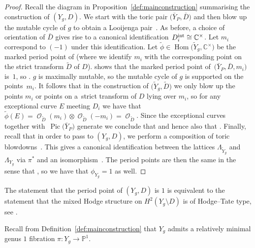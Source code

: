 \documentclass[pdftex]{sigma}
\numberwithin{equation}{section}
\DeclareMathOperator{\Hom}{{Hom}}
\DeclareMathOperator{\Pic}{{Pic}}
\DeclareMathOperator{\cO}{\mathcal{O}}
\newcommand{\CC}{\mathbb{C}}
\newcommand{\PP}{\mathbb{P}}
\begin{document}
	\begin{proof}
		Recall the diagram in Proposition~\ref{def:mainconstruction} summarising the construction of $(Y_g, D)$. We start with the toric pair $\bigl(\bar{Y}_P, \bar{D}\bigr)$ and then blow up the mutable cycle of $g$ to obtain a Looijenga pair~.
		As before, a choice of orientation of $\bar{D}$ gives rise to a canonical identification~${D_i^{\rm int} \cong \CC^\times}$. Let $m_i$ correspond to $(-1)$ under this identification. Let $\tilde{\phi} \in \Hom\bigl(\tilde{Y}_g, \CC^\times\bigr)$ be the marked period point of  (where we identify $m_i$ with the corresponding point on the strict transform $\tilde{D}$ of $D$).
		\cite[Lemma 2.8]{GrossHackingKeelLooijengapairs} shows that the marked period point of~${\bigl(\bar{Y}_P, \bar{D}, m_i\bigr)}$ is~$1$, so .
		$g$ is maximally mutable, so the mutable cycle of $g$ is supported on the points~$m_i$. It follows that in the construction of $\bigl(\tilde{Y}_g, \tilde{D}\bigr)$ we only blow up the points $m_i$ or points on a~strict transform of $D$ lying over $m_i$, so for any exceptional curve $E$ meeting $D_i$ we have that $\tilde{\phi}(E)=\cO_{\tilde{D}}(m_i) \otimes \cO_{\tilde{D}}(-m_i)=\cO_{\tilde{D}}$. Since the exceptional curves together with~$\Pic\bigl(\bar{Y}_P\bigr)$ generate \smash{$\Pic\bigl(\tilde{Y}_g\bigr)$} we conclude that  and hence also that .
		Finally, recall that in order to pass to $(Y_g, D)$, we perform a composition of toric blowdowns~. This gives a canonical identification between the lattices $\Lambda_{\tilde{Y}_g}$ and $\Lambda_{Y_g}$ via $\pi^*$ and an isomorphism~\smash{$\pi^* \colon \Pic^0(D) \rightarrow \Pic^0\bigl(\tilde{D}\bigr)$}. The period points are then the same in the sense that , so we have that $\phi_{Y_g}=1$ as well.
	\end{proof}
	
	\begin{Remark}
		The statement that the period point of $(Y_g, {D})$ is $1$ is equivalent to the statement that the mixed Hodge structure on $H^2(Y_g \setminus D)$ is of Hodge--Tate type, see \cite[Proposition~3.12]{Friedman}.
	\end{Remark}

	Recall from Definition~\ref{def:mainconstruction} that $Y_g$ admits a relatively minimal genus $1$ fibration $\pi \colon Y_g \rightarrow \PP^1$.
	
\end{document}
